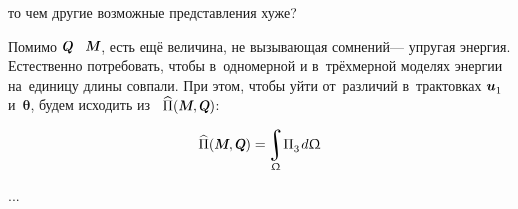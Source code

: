 \begin{otherlanguage}{russian}
\vspace{-0.2em}\noindent
то чем другие возможные представления хуже?

Помимо $\internalforce$ ~$\internalmoment$, есть ещё величина, не вызывающая сомнений\:--- упругая энергия.
Естественно потребовать, чтобы в~одно\-мерной и в~трёх\-мерной моделях энергии на~единицу длины совпали.
При этом, чтобы уйти от~различий в~трактовках ${\bm{u}_{\raisemath{-0.2ex}{1}}}$ и~$\bm{\theta}$, будем исходить из ~${\widehat{\potential}(\internalmoment, \internalforce)}$:

\nopagebreak\vspace{-0.1em}\begin{equation*}
\widehat{\potential}(\internalmoment, \internalforce) = \hspace{-0.2ex} \integral\displaylimits_{\rodsection} \hspace{-0.4ex} \potential_{\raisemath{-0.2ex}{3}} \hspace{.2ex} d\rodsection
\end{equation*}

...

\end{otherlanguage}



\label{para:variationalmethodforonedimension}

